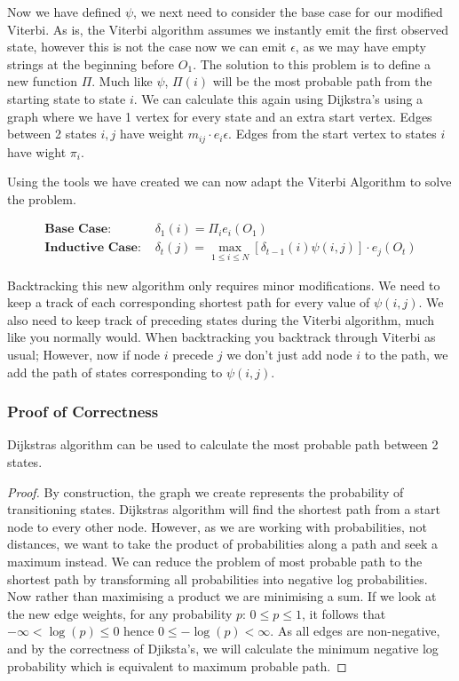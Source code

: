 Now we have defined $\psi$, we next need to consider the base case for our modified Viterbi.
As is, the Viterbi algorithm assumes we instantly emit the first observed state, however this is not the case now we can emit $\epsilon$, as we may have empty strings at the beginning before $O_1$. 
The solution to this problem is to define a new function $\Pi$. 
Much like $\psi$, $\Pi(i)$ will be the most probable path from the starting state to state $i$. 
We can calculate this again using Dijkstra's using a graph where we have 1 vertex for every state and an extra start vertex.
Edges between 2 states $i,j$ have weight $m_{ij}\cdot e_i{\epsilon}$. Edges from the start vertex to states $i$ have wight $\pi_i$.

Using the tools we have created we can now adapt the Viterbi Algorithm to solve the problem.


\begin{align*}
    \textbf{Base Case: } &\delta_1(i) = \Pi_i e_i(O_1)\\
    \textbf{Inductive Case: } &\delta_t(j) = \max_{1\leq i \leq N}[\delta_{t-1}(i)\psi(i,j)]\cdot e_j(O_t)
\end{align*}

Backtracking this new algorithm only requires minor modifications. 
We need to keep a track of each corresponding shortest path for every value of $\psi(i,j)$.
We also need to keep track of preceding states during the Viterbi algorithm, much like you normally would.
When backtracking you backtrack through Viterbi as usual; However, now if node $i$ precede $j$ we don't just add node $i$ to the path, we add the path of states corresponding to $\psi(i,j)$.

\subsubsection*{Proof of Correctness}


\begin{lemma}
    \label{prb:djPath}
    Dijkstras algorithm can be used to calculate the most probable path between 2 states.
\end{lemma}
\begin{proof}
    By construction, the graph we create represents the probability of transitioning states. 
    Dijkstras algorithm will find the shortest path from a start node to every other node. 
    However, as we are working with probabilities, not distances, we want to take the product of probabilities along a path and seek a maximum instead.
    We can reduce the problem of most probable path to the shortest path by transforming all probabilities into negative log probabilities. Now rather than maximising a product we are minimising a sum.
    If we look at the new edge weights, for any probability $p$: $0 \leq p \leq 1$, it follows that $-\infty < \log(p) \leq 0$ hence $0 \leq -\log(p) < \infty$.
    As all edges are non-negative, and by the correctness of Djiksta's, we will calculate the minimum negative log probability which is equivalent to maximum probable path.
\end{proof}

